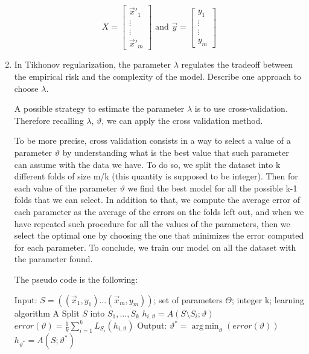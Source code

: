 \documentclass[a4paper,11pt,oneside]{book}
\DeclareMathOperator*{\argmin}{arg\,min}
\begin{document}
\begin{enumerate}
\begin{solution}
        $$X = \begin{bmatrix} 
        \vec{x}'_1 \\
        \vdots \\
        \vdots \\
        \vec{x}'_m
        \end{bmatrix} \text{ and } \vec{y} = \begin{bmatrix}
        y_1 \\
        \vdots \\
        \vdots \\
        y_m
        \end{bmatrix}$$
    \end{solution}
\item In Tikhonov regularization, the parameter $\lambda$ regulates the tradeoff between the empirical risk and the complexity of the model. Describe one approach to choose $\lambda$.
    \begin{solution}
        A possible strategy to estimate the parameter $\lambda$ is to use cross-validation. Therefore recalling $\lambda$, $\vartheta$, we can apply the cross validation method.
        
        To be more precise, cross validation consists in a way to select a value of a parameter $\vartheta$ by understanding what is the best value that such parameter can assume with the data we have.
        To do so, we split the dataset into k different folds of size m/k (this quantity is supposed to be integer). Then for each value of the parameter $\vartheta$ we find the best model for all the possible k-1 folds that we can select. In addition to that, we compute the average error of each parameter as the average of the errors on the folds left out, and when we have repeated such procedure for all the values of the parameters, then we select the optimal one by choosing the one that minimizes the error computed for each parameter. To conclude, we train our model on all the dataset with the parameter found.
        
        The pseudo code is the following:
        
        \begin{algorithmic}[1]
        \State Input: $S = ((\vec{x}_1,y_1) ... (\vec{x}_m,y_m))$; set of parameters $\Theta$; integer k; learning algorithm A
        \State Split $S$ into $S_1,...,S_k$
        \For{$\vartheta \in \Theta$}
            \State $h_{i,\vartheta} = A(S\setminus S_i; \vartheta)$
        \EndFor
        \State $error(\vartheta) = \frac{1}{k}\sum_{i=1}^k L_{S_i}(h_{i,\vartheta})$
        \EndFor
        \State Output: $\vartheta^* = \argmin_\vartheta(error(\vartheta))$
        \State \hspace{35pt} $h_{\vartheta^*} = A(S; \vartheta^*)$
        \end{algorithmic}
    \end{solution}
\end{enumerate}
\end{document}
